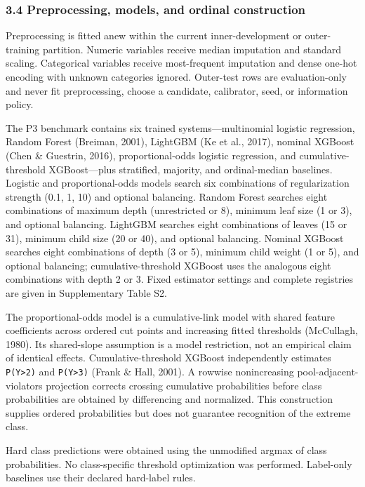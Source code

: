 \documentclass[
  a4paper,
  review]{elsarticle}
\begin{document}
\subsubsection{3.4 Preprocessing, models, and ordinal
construction}\label{preprocessing-models-and-ordinal-construction}

Preprocessing is fitted anew within the current inner-development or
outer-training partition. Numeric variables receive median imputation
and standard scaling. Categorical variables receive most-frequent
imputation and dense one-hot encoding with unknown categories ignored.
Outer-test rows are evaluation-only and never fit preprocessing, choose
a candidate, calibrator, seed, or information policy.

The P3 benchmark contains six trained systems---multinomial logistic
regression, Random Forest (Breiman, 2001), LightGBM (Ke et al., 2017),
nominal XGBoost (Chen \& Guestrin, 2016), proportional-odds logistic
regression, and cumulative-threshold XGBoost---plus stratified,
majority, and ordinal-median baselines. Logistic and proportional-odds
models search six combinations of regularization strength (0.1, 1, 10)
and optional balancing. Random Forest searches eight combinations of
maximum depth (unrestricted or 8), minimum leaf size (1 or 3), and
optional balancing. LightGBM searches eight combinations of leaves (15
or 31), minimum child size (20 or 40), and optional balancing. Nominal
XGBoost searches eight combinations of depth (3 or 5), minimum child
weight (1 or 5), and optional balancing; cumulative-threshold XGBoost
uses the analogous eight combinations with depth 2 or 3. Fixed estimator
settings and complete registries are given in Supplementary Table S2.

The proportional-odds model is a cumulative-link model with shared
feature coefficients across ordered cut points and increasing fitted
thresholds (McCullagh, 1980). Its shared-slope assumption is a model
restriction, not an empirical claim of identical effects.
Cumulative-threshold XGBoost independently estimates
\texttt{P(Y\textgreater{}2)} and \texttt{P(Y\textgreater{}3)} (Frank \&
Hall, 2001). A rowwise nonincreasing pool-adjacent-violators projection
corrects crossing cumulative probabilities before class probabilities
are obtained by differencing and normalized. This construction supplies
ordered probabilities but does not guarantee recognition of the extreme
class.

Hard class predictions were obtained using the unmodified argmax of
class probabilities. No class-specific threshold optimization was
performed. Label-only baselines use their declared hard-label rules.
\end{document}
